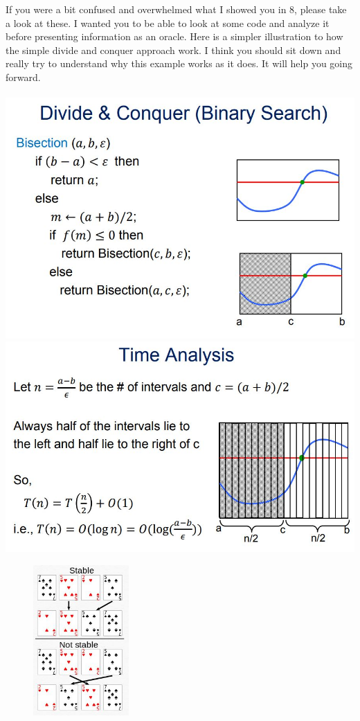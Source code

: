 \documentclass[12pt]{article}
\begin{document}
\noindent If you were a bit confused and overwhelmed what I showed you in 8, please take a look at these. I wanted you to be able to look at some code and analyze it before presenting information as an oracle. Here is a simpler illustration to how the simple divide and conquer approach work. I think you should sit down and really try to understand why this example works as it does. It will help you going forward.\\\\
\includegraphics[scale =0.5]{bs.jpg}\\
\includegraphics[scale =0.5]{bs2.jpg}\\
\newpage
\begin{figure}
    \centering
    \includegraphics[width=0.325\textwidth]{ssort.jpg}
\end{figure}
\end{document}
